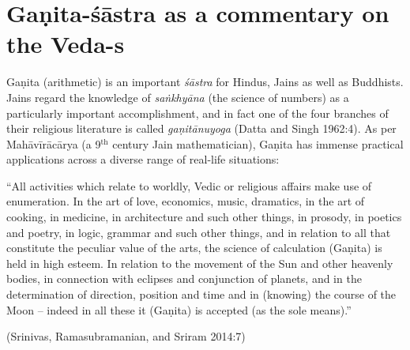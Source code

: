 \section*{Gaṇita-śāstra as a commentary on the Veda-s}

Gaṇita (arithmetic) is an important {\sl śāstra} for Hindus, Jains as well as Buddhists. Jains regard the knowledge of {\sl saṅkhyāna} (the science of numbers) as a particularly important accomplishment, and in fact one of the four branches of their religious literature is called {\sl gaṇitānuyoga} (Datta and Singh 1962:4). As per Mahāvīrācārya (a 9$^{\text{th}}$ century Jain mathematician), Gaṇita has immense practical applications across a diverse range of real-life situations: 
\begin{myquote}
``All activities which relate to worldly, Vedic or religious affairs make use of enumeration. In the art of love, economics, music, dramatics, in the art of cooking, in medicine, in architecture and such other things, in prosody, in poetics and poetry, in logic, grammar and such other things, and in relation to all that constitute the peculiar value of the arts, the science of calculation (Gaṇita) is held in high esteem. In relation to the movement of the Sun and other heavenly bodies, in connection with eclipses and conjunction of planets, and in the determination of direction, position and time and in (knowing) the course of the Moon -- indeed in all these it (Gaṇita) is accepted (as the sole means).''

\hfill (Srinivas, Ramasubramanian, and Sriram 2014:7)
\end{myquote}

